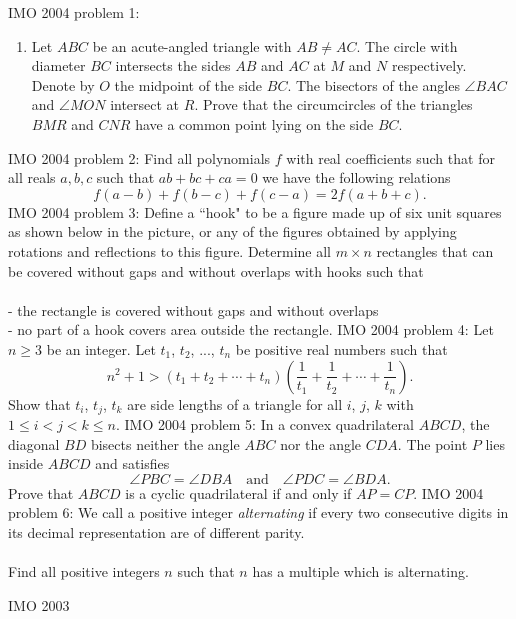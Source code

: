 IMO 2004 problem 1:  \begin{enumerate}
  \item Let $ABC$ be an acute-angled triangle with $AB\neq AC$. The circle with diameter $BC$ intersects the sides $AB$ and $AC$ at $M$ and $N$ respectively. Denote by $O$ the midpoint of the side $BC$. The bisectors of the angles $\angle BAC$ and $\angle MON$ intersect at $R$. Prove that the circumcircles of the triangles $BMR$ and $CNR$ have a common point lying on the side $BC$.
\end{enumerate} 
IMO 2004 problem 2:  Find all polynomials $f$ with real coefficients such that for all reals $a,b,c$ such that $ab+bc+ca = 0$ we have the following relations
\[ f(a-b) + f(b-c) + f(c-a) = 2f(a+b+c). \] 
IMO 2004 problem 3:  Define a ``hook" to be a figure made up of six unit squares as shown below in the picture, or any of the figures obtained by applying rotations and reflections to this figure.
Determine all $ m\times n$ rectangles that can  be covered without gaps and without overlaps with hooks such that \\\\
- the rectangle is covered without gaps and without overlaps \\
- no part of a hook covers area outside the rectangle. 
IMO 2004 problem 4:  Let $n \geq 3$ be an integer. Let $t_1$, $t_2$, ..., $t_n$ be positive real numbers such that
\[
n^2 + 1 > \left( t_1 + t_2 + \cdots + t_n \right) \left( \frac{1}{t_1} + \frac{1}{t_2} + \cdots + \frac{1}{t_n} \right).
\]
Show that $t_i$, $t_j$, $t_k$ are side lengths of a triangle for all $i$, $j$, $k$ with $1 \leq i < j < k \leq n$. 
IMO 2004 problem 5:  In a convex quadrilateral $ABCD$, the diagonal $BD$ bisects neither the angle $ABC$ nor the angle $CDA$. The point $P$ lies inside $ABCD$ and satisfies
\[ \angle PBC=\angle DBA\quad\text{and}\quad \angle PDC=\angle BDA. \]
Prove that $ABCD$ is a cyclic quadrilateral if and only if $AP=CP$. 
IMO 2004 problem 6:  We call a positive integer \textit{alternating} if every two consecutive digits in its decimal representation are of different parity. \\\\
Find all positive integers $n$ such that $n$ has a multiple which is alternating. 

IMO 2003 


